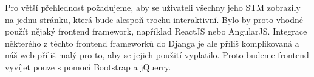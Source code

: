 Pro větší přehlednost požadujeme, aby se uživateli všechny jeho STM zobrazily na jednu stránku,
která bude alespoň trochu interaktivní.
Bylo by proto vhodné použít nějaký frontend framework, například ReactJS nebo AngularJS. %
Integrace některého z těchto frontend frameworků do Djanga je ale příliš komplikovaná a náš web
příliš malý pro to, aby se jejich použití vyplatilo.
Proto budeme frontend vyvíjet pouze s pomocí Bootstrap a jQuerry.
